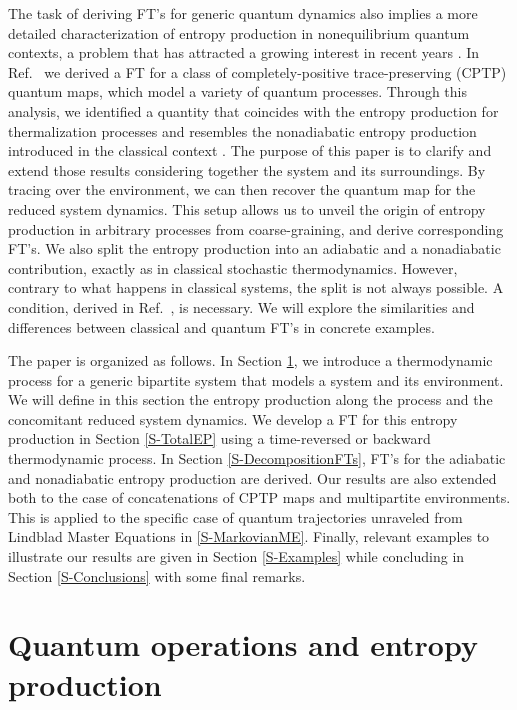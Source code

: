 \documentclass[aps,prx,twocolumn,showpacs,floatfix,superscriptaddress,graphics,longbibliography]{revtex4-1}
\begin{document}
The task of deriving FT's for generic quantum dynamics also implies a more detailed characterization of entropy production in nonequilibrium quantum contexts, a problem that has attracted a growing interest in recent years \cite{EspositoNJP, LutzEP, SagawaEntropies, JordanParrondo, JordanSagawa, Leggio, DeffnerPS, MHP, Auffeves, Auffeves2, Santos, Lewestein}.
In Ref.~\cite{MHP} we derived a FT for a class of completely-positive trace-preserving (CPTP) quantum maps, which model a variety of quantum processes. 
Through this analysis, we identified a quantity that coincides with the entropy production for thermalization processes and resembles the nonadiabatic entropy production introduced in the classical context \cite{EspositoFaces, EspositoFacesI,EspositoFacesII}. 
The purpose of this paper is to clarify and extend those results considering together the system and its surroundings.
By tracing over the environment, we can then recover the quantum map for the reduced system dynamics.
This setup allows us to unveil the origin of entropy production in arbitrary processes from coarse-graining, and derive corresponding FT's.
We also split the entropy production into an adiabatic and a nonadiabatic contribution, exactly as in classical stochastic thermodynamics. 
However, contrary to what happens in classical systems, the split is not always possible. A condition, derived in Ref.~\cite{MHP}, is necessary. We will explore the similarities and differences between classical and quantum FT's in concrete examples.
 
The paper is organized as follows. In Section \ref{S-Model}, we introduce a thermodynamic process for a generic bipartite system that models a system and its environment. We will define in this section the entropy production along the process and the concomitant reduced system dynamics. 
We develop a FT for this entropy production in Section \ref{S-TotalEP} using a time-reversed or backward thermodynamic process.
In Section \ref{S-DecompositionFTs}, FT's for the adiabatic and nonadiabatic entropy production are derived. 
Our results are also extended both to the case of concatenations of CPTP maps and multipartite environments. 
This is applied to the specific case of quantum trajectories unraveled from Lindblad Master Equations in \ref{S-MarkovianME}. 
Finally, relevant examples to illustrate our results are given in Section \ref{S-Examples} while concluding in Section \ref{S-Conclusions} with some final remarks.


\section{Quantum operations and entropy production} \label{S-Model}
\end{document}
